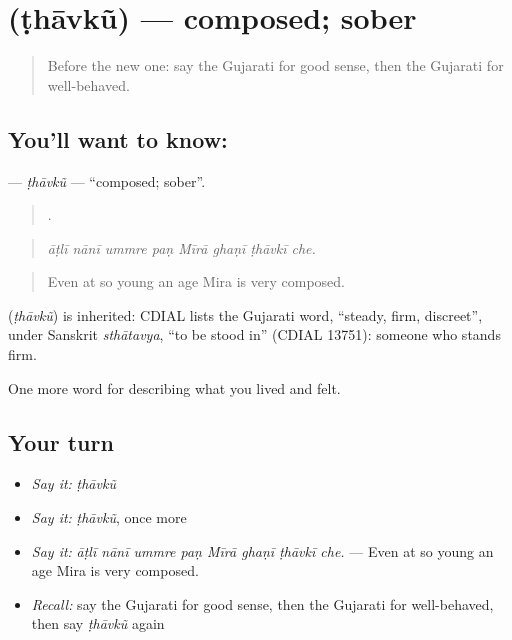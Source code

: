 \section[\texorpdfstring{\gu{ઠાવકું} (ṭhāvkũ)}{ઠાવકું (ṭhāvkũ)}]{ (ṭhāvkũ) — composed; sober}

\label{lesson:GU-C464-thavku}



\begin{quote}
Before the new one: say the Gujarati for good sense, then the Gujarati for well-behaved.
\end{quote}

\subsection*{You'll want to know: }
\textbf{} — \emph{ṭhāvkũ} — \textquotedblleft{}composed; sober\textquotedblright{}.

\begin{quote}
       .
\end{quote}

\begin{quote}
\emph{āṭlī nānī ummre paṇ Mīrā ghaṇī ṭhāvkī che.}
\end{quote}

\begin{quote}
Even at so young an age Mira is very composed.
\end{quote}

\begin{cousinweb}
\textbf{} (\emph{ṭhāvkũ}) is inherited: CDIAL lists the Gujarati word, \textquotedblleft{}steady, firm, discreet\textquotedblright{}, under Sanskrit \emph{sthātavya}, \textquotedblleft{}to be stood in\textquotedblright{} (CDIAL 13751): someone who stands firm.
\end{cousinweb}

\begin{grammarlens}[title={What you've built}]
One more word for describing what you lived and felt.
\end{grammarlens}

\subsection*{Your turn}
\begin{itemize}
\raggedright
  \item \emph{Say it:} \emph{ṭhāvkũ}
  \item \emph{Say it:} \emph{ṭhāvkũ}, once more
  \item \emph{Say it:} \emph{āṭlī nānī ummre paṇ Mīrā ghaṇī ṭhāvkī che.} — Even at so young an age Mira is very composed.
  \item \emph{Recall:} say the Gujarati for good sense, then the Gujarati for well-behaved, then say \emph{ṭhāvkũ} again
\end{itemize}

